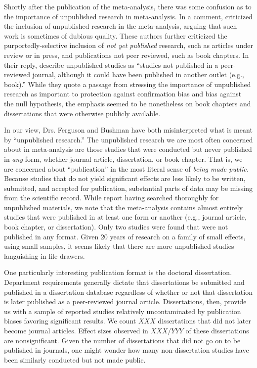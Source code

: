 \documentclass[man]{apa6}
\begin{document}
Shortly after the publication of the \citet{Anderson:etal:2010} meta-analysis, there was some confusion as to the importance of unpublished research in meta-analysis. In a comment, \citet{Ferguson:Kilburn:2010} %
criticized the inclusion of unpublished research in the meta-analysis, arguing that such work is sometimes of dubious quality. These authors further criticized the purportedly-selective inclusion of {\em not yet published} research, such as articles under review or in press, and publications not peer reviewed, such as book chapters. In their reply, \citet{Bushman:etal:2010} describe unpublished studies as ``studies not published in a peer-reviewed journal, although it could have been published in another outlet (e.g., book).'' While they quote a passage from \citet{Cooper:2009} stressing the importance of unpublished research as important to protection against confirmation bias and bias against the null hypothesis, the emphasis seemed to be nonetheless on book chapters and dissertations that were otherwise publicly available.

In our view, Drs. Ferguson and Bushman have both misinterpreted what is meant by ``unpublished research.'' The unpublished research we are most often concerned about in meta-analysis are those studies that were conducted but never published in {\em any} form, whether journal article, dissertation, or book chapter. That is, we are concerned about ``publication'' in the most literal sense of {\em being made public.}  Because studies that do not yield significant effects are less likely to be written, submitted, and accepted for publication, substantial parts of data may be missing from the scientific record. While \citet{Anderson:etal:2010} report having searched thoroughly for unpublished materials, we note that the meta-analysis contains almost entirely studies that were published in at least one form or another (e.g., journal article, book chapter, or dissertation). Only two studies were found that were not published in any format. Given 20 years of research on a family of small effects, using small samples, it seems likely that there are more unpublished studies languishing in file drawers.



One particularly interesting publication format is the doctoral dissertation. Department requirements generally dictate that dissertations be submitted and published in a dissertation database regardless of whether or not that dissertation is later published as a peer-reviewed journal article. Dissertations, then, provide us with a sample of reported studies relatively uncontaminated by publication biases favoring significant results. We count $XXX$ dissertations that did not later become journal articles. Effect sizes observed in $XXX/YYY$ of these dissertations are nonsignificant. Given the number of dissertations that did not go on to be published in journals, one might wonder how many non-dissertation studies have been similarly conducted but not made public. 
\end{document}
